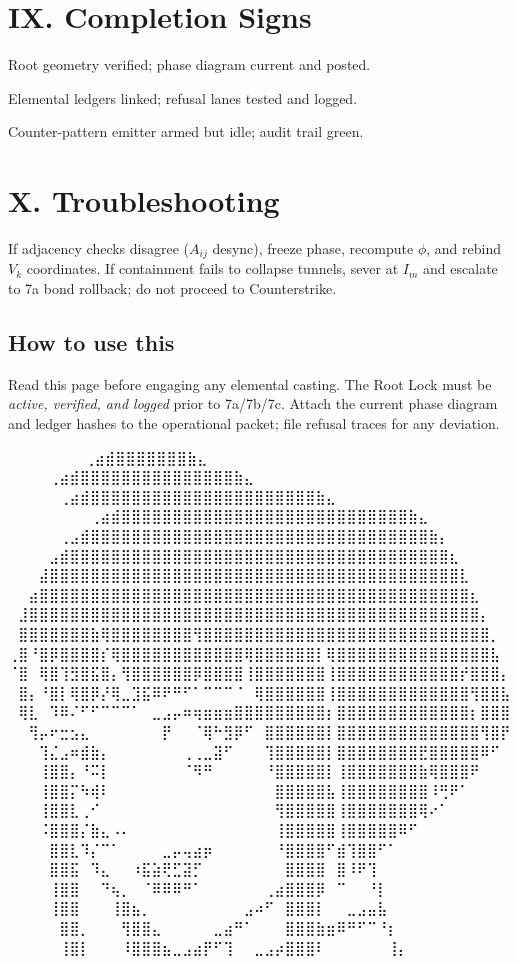\section*{IX. Completion Signs}
\begin{tightitemize}
  \item Root geometry verified; phase diagram current and posted.
  \item Elemental ledgers linked; refusal lanes tested and logged.
  \item Counter-pattern emitter armed but idle; audit trail green.
\end{tightitemize}

\section*{X. Troubleshooting}
If adjacency checks disagree (\(A_{ij}\) desync), freeze phase, recompute \(\phi\), and rebind $V_k$ coordinates. If containment fails to collapse tunnels, sever at $I_m$ and escalate to 7a bond rollback; do not proceed to Counterstrike.

\subsection*{How to use this}
Read this page before engaging any elemental casting. The Root Lock must be \emph{active, verified, and logged} prior to 7a/7b/7c. Attach the current phase diagram and ledger hashes to the operational packet; file refusal traces for any deviation.
\iffalse

  ⠀⠀⠀⠀⠀             ⠀⠀⢀⣴⣾⣿⣿⣿⣿⣿⣿⣿⣷⣄⠀⠀⠀⠀⠀⠀⠀⠀
⠀⠀⠀  ⠀      ⠀⠀⠀⠀⢀⣴⣾⣿⣿⣿⣿⣿⣿⣿⣿⣿⣿⣿⣿⣿⣿⣿⣷⣄⠀⠀⠀⠀⠀⠀⠀⠀
⠀⠀ ⠀   ⠀⠀⠀⠀⠀⢀⣴⣾⣿⣿⣿⣿⣿⣿⣿⣿⣿⣿⣿⣿⣿⣿⣿⣿⣿⣿⣿⣿⣿⣿⣷⣄⠀⠀⠀⠀⠀⠀⠀⠀
⠀⠀⠀⠀⠀⠀⠀⠀⢀⣴⣾⣿⣿⣿⣿⣿⣿⣿⣿⣿⣿⣿⣿⣿⣿⣿⣿⣿⣿⣿⣿⣿⣿⣿⣿⣿⣿⣿⣿⣷⣄⠀⠀⠀⠀⠀⠀⠀⠀
⠀⠀⠀⠀⠀⢀⣠⣾⣿⣿⣿⣿⣿⣿⣿⣿⣿⣿⣿⣿⣿⣿⣿⣿⣿⣿⣿⣿⣿⣿⣿⣿⣿⣿⣿⣿⣿⣿⣿⣿⣿⣷⡄⠀⠀⠀⠀⠀⠀
⠀⠀⠀⠀⣠⣾⣿⣿⣿⣿⣿⣿⣿⣿⣿⣿⣿⣿⣿⣿⣿⣿⣿⣿⣿⣿⣿⣿⣿⣿⣿⣿⣿⣿⣿⣿⣿⣿⣿⣿⣿⣿⣿⣆⠀⠀⠀⠀⠀
⠀⠀⠀⣼⣿⣿⣿⣿⣿⣿⣿⣿⣿⣿⣿⣿⣿⣿⣿⣿⣿⣿⣿⣿⣿⣿⣿⣿⣿⣿⣿⣿⣿⣿⣿⣿⣿⣿⣿⣿⣿⣿⣿⣿⣇⠀⠀⠀⠀
⠀⠀⣴⣿⣿⣿⣿⣿⣿⣿⣿⣿⣿⣿⣿⣿⣿⣿⣿⣿⣿⣿⣿⣿⣿⣿⣿⣿⣿⣿⣿⣿⣿⣿⣿⣿⣿⣿⣿⣿⣿⣿⣿⣿⣿⣆⠀⠀⠀
⠀⣸⣿⣿⣿⣿⣿⣿⣿⣿⣿⣿⣿⣿⣿⣿⣿⣿⣿⣿⣿⣿⣿⣿⣿⣿⣿⣿⣿⣿⣿⣿⣿⣿⣿⣿⣿⣿⣿⣿⣿⣿⣿⣿⣿⣿⡄⠀⠀
⠀⣿⣿⣿⣿⣿⣿⣿⣷⢿⣿⣿⣿⣿⣿⣿⣿⣿⢻⣿⣿⣿⣿⣿⣿⣿⣿⣿⣿⣿⣿⣿⣿⣿⣿⣿⣿⣿⣿⣿⣿⣿⣿⣿⣿⣿⣿⡀⠀
⢀⣿⠘⣿⡿⣿⣿⣿⣿⡎⢿⣿⣿⣿⣿⣿⣿⣿⣿⣿⣿⣿⣿⢿⣿⣿⣿⣿⣿⣿⡇⢿⣿⣿⣿⣿⣿⣿⣿⣿⣿⣿⣿⣿⣿⣿⣿⣧⠀
⠈⣿⠀⢿⣿⢹⣻⣿⣯⣿⡄⢻⣿⣿⣿⣿⣿⣿⡿⣿⣿⣿⣿⢸⣿⣿⣿⣿⣿⣿⣿⢸⣿⣿⣿⣿⣿⣿⣿⣿⣿⣿⣿⣿⡞⣿⣿⣿⡄
⠀⣿⡄⠘⣿⡇⢿⣿⡿⡜⢿⣀⣹⣯⠿⠟⠛⠋⠁⠉⠉⠉⠈⠀⢿⣿⣿⣿⣿⣿⣿⢸⣿⣿⣿⣿⣿⣿⣿⣿⣿⣿⣿⣿⣿⢻⣿⣿⣧
⠀⢿⣇⠀⠹⠿⠌⠋⠋⠉⠉⠉⠁⠀⣀⣠⡤⠶⢶⣶⣶⣶⣿⣿⣿⣿⣿⣿⣿⣿⣿⡆⣿⣿⣿⣿⣿⣿⣿⣿⣿⣿⣿⣿⣿⡆⣿⣿⣿
⠀⠀⢻⡤⠖⣒⣢⣄⠀⠀⠀⠀⠀⠀⠀⡟⠀⠀⠈⢿⠓⣻⡿⠋⠀⣿⣿⣿⣿⣿⣿⡇⣿⣿⣿⣿⣿⣿⣿⣿⣿⣿⣿⣿⣿⣿⢻⣿⡟
⠀⠀⠀⢹⣌⣠⠶⣾⣷⡄⠀⠀⠀⠀⠀⠀⠀⢀⢀⣀⣽⠋⠀⠀⠀⢹⣿⣿⣿⣿⣿⡇⣿⣿⣿⣿⣿⣿⣿⣿⣟⣿⣿⣿⣿⣿⠿⠋⠀
⠀⠀⠀⢸⣿⣿⡄⠘⠭⡇⠀⠀⠀⠀⠀⠀⠀⠈⠻⠛⠀⠀⠀⠀⠀⠘⣿⣿⣿⣿⣿⡇⢸⣿⣿⣿⣿⣿⣿⣿⣷⢿⣿⣿⣿⠟⠀⠀⠀
⠀⠀⠀⢸⣿⣿⡍⠳⢾⠇⠀⠀⠀⠀⠀⠀⠀⠀⠀⠀⠀⠀⠀⠀⠀⠀⣿⣿⣿⣿⣿⣧⢸⣿⣿⣿⣿⣿⣿⣿⣿⠸⢛⠟⠁⠀⠀⠀⠀
⠀⠀⠀⢸⣿⣿⣇⢀⠊⠀⠀⠀⠀⠀⠀⠀⠀⠀⠀⠀⠀⠀⠀⠀⠀⠀⢻⣿⣿⣿⣿⣿⢸⣿⣿⣿⣿⣿⣿⣿⢿⠔⠁⠀⠀⠀⠀⠀⠀
⠀⠀⠀⠨⣿⣿⣿⡌⣷⣄⠠⠄⠀⠀⠀⠀⠀⠀⠀⠀⠀⠀⠀⠀⠀⠀⢸⣿⣿⣿⣿⣿⢸⣿⣿⣿⣿⣿⠿⠋⠀⠀⠀⠀⠀⠀⠀⠀⠀
⠀⠀⠀⠀⣿⣿⣇⠹⡌⠉⠁⠀⠀⠀⠀⣀⡤⢤⣴⡶⠀⠀⠀⠀⠀⠀⠘⣿⣿⣿⣿⠋⣾⢹⣿⣿⠋⠁⠀⠀⠀⠀⠀⠀⠀⠀⠀⠀⠀
⠀⠀⠀⠀⣿⣿⣯⠀⠹⣄⠀⠀⠰⣯⣵⢟⣋⣽⡋⠀⠀⠀⠀⠀⠀⠀⠀⣿⣿⣿⣿⠀⣿⠸⠟⢹⠀⠀⠀⠀⠀⠀⠀⠀⠀⠀⠀⠀⠀
⠀⠀⠀⠀⢸⣿⣿⠀⠀⠙⢦⡀⠀⠈⠿⠿⠿⠛⠁⠀⠀⠀⠀⠀⠀⢀⣴⣿⣿⣿⡿⠀⠉⠀⠀⠘⡇⠀⠀⠀⠀⠀⠀⠀⠀⠀⠀⠀⠀
⠀⠀⠀⠀⢸⣿⣿⠀⠀⠀⢸⣿⣦⡀⠀⠀⠀⠀⠀⠀⠀⠀⠀⣠⠴⠋⠀⣿⣿⣿⡇⠀⠀⣀⣠⣤⣧⠀⠀⠀⠀⠀⠀⠀⠀⠀⠀⠀⠀
⠀⠀⠀⠀⠀⣿⣿⡀⠀⠀⠀⢻⣿⣿⣄⠀⠀⠀⠀⠀⣀⣴⠛⠁⠀⠀⠀⣿⣿⣿⣷⣶⠿⠛⠋⠉⠘⡆⠀⠀⠀⠀⠀⠀⠀⠀⠀⠀⠀
⠀⠀⠀⠀⠀⢸⣿⡇⠀⠀⠀⠸⣿⣿⣿⣦⣀⣠⣴⡟⠋⢹⠀⠀⣀⣠⡴⣿⣿⣿⠇⠀⠀⠀⠀⠀⠀⢸⡄⠀⠀⠀⠀⠀⠀⠀⠀⠀⠀

